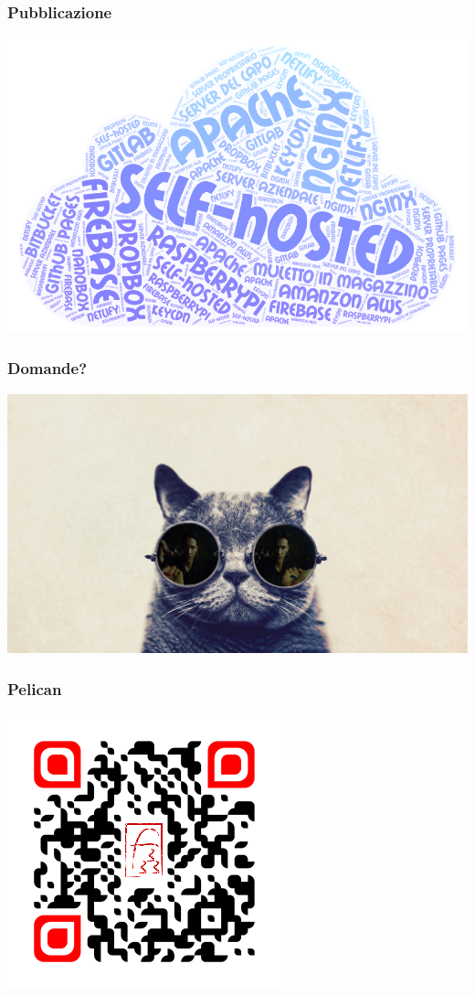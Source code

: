 \begin{frame}
	\frametitle{Pubblicazione}
	\begin{center}
		\includegraphics[scale=0.32]{img/WordArt.png}
	\end{center}
\end{frame}

\begin{frame}
	\frametitle{Domande?}
	\begin{center}
		\includegraphics[scale=0.15]{img/cat-with-glasses}
	\end{center}
\end{frame}

\begin{frame}
	\frametitle{Pelican}
	\begin{center}
		\includegraphics[scale=0.67]{img/fundor333}
	\end{center}
\end{frame}



